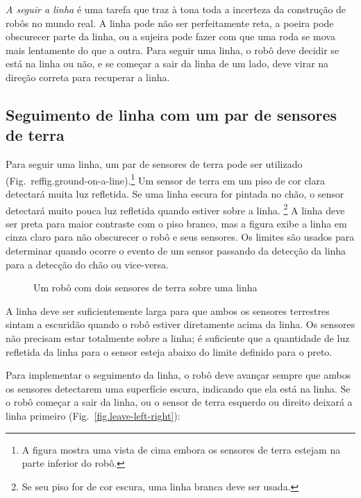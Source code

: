 \emph{A seguir a linha} é uma tarefa que traz à tona toda a incerteza da construção de robôs no mundo real. A linha pode não ser perfeitamente reta, a poeira pode obscurecer parte da linha, ou a sujeira pode fazer com que uma roda se mova mais lentamente do que a outra. Para seguir uma linha, o robô deve decidir se está na linha ou não, e se começar a sair da linha de um lado, deve virar na direção correta para recuperar a linha.

\subsection{Seguimento de linha com um par de sensores de terra}

Para seguir uma linha, um par de sensores de terra pode ser utilizado (Fig.~ref{fig.ground-on-a-line}).\footnote{A figura mostra uma vista de cima embora os sensores de terra estejam na parte inferior do robô.} Um sensor de terra em um piso de cor clara detectará muita luz refletida. Se uma linha escura for pintada no chão, o sensor detectará muito pouca luz refletida quando estiver sobre a linha. \footnote{Se seu piso for de cor escura, uma linha branca deve ser usada.} A linha deve ser preta para maior contraste com o piso branco, mas a figura exibe a linha em cinza claro para não obscurecer o robô e seus sensores. Os limites são usados para determinar quando ocorre o evento de um sensor passando da detecção da linha para a detecção do chão ou vice-versa.

\begin{figure}
\begin{center}
\caption{Um robô com dois sensores de terra sobre uma linha}\label{fig.ground-on-a-line}
\end{center}
\end{figure}

A linha deve ser suficientemente larga para que ambos os sensores terrestres sintam a escuridão quando o robô estiver diretamente acima da linha. Os sensores não precisam estar totalmente sobre a linha; é suficiente que a quantidade de luz refletida da linha para o sensor esteja abaixo do limite definido para o preto.

Para implementar o seguimento da linha, o robô deve avançar sempre que ambos os sensores detectarem uma superfície escura, indicando que ela está na linha. Se o robô começar a sair da linha, ou o sensor de terra esquerdo ou direito deixará a linha primeiro (Fig.~\ref{fig.leave-left-right}):

